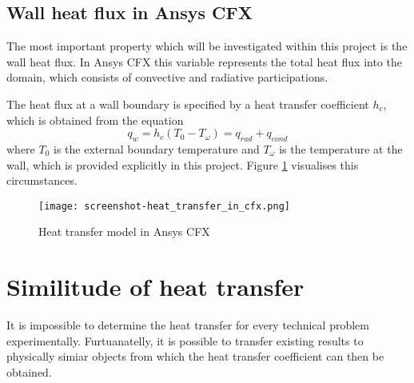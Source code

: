 \subsection{Wall heat flux in Ansys CFX}
The most important property which will be investigated within this project is the wall heat flux. In Ansys CFX this variable represents the total heat flux into the domain, which consists of convective and radiative participations.

The heat flux at a wall boundary is specified by a heat transfer coefficient $h_c$, which is obtained from the equation
\begin{equation}
q_w = h_c (T_0 - T_{\omega} ) = q_{rad} + q_{cond}
\end{equation}
where $T_0$ is the external boundary temperature and $T_{\omega}$ is the temperature at the wall, which is provided explicitly in this project. Figure \ref{fig:ht_in_cfx} visualises this circumstances.
\begin{figure}[ht]
\centering
\texttt{[image: screenshot-heat\_transfer\_in\_cfx.png]}
\caption{Heat transfer model in Ansys CFX}
\label{fig:ht_in_cfx}
\end{figure}
\section{Similitude of heat transfer}
It is impossible to determine the heat transfer for every technical problem experimentally. Furtuanatelly, it is possible to transfer existing results to physically simiar objects from which the heat transfer coefficient can then be obtained.

